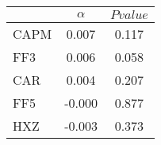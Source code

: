 \begin{tabular}{lcc}
\toprule
 & $\alpha$ & $Pvalue$ \\
\midrule
CAPM & 0.007 & 0.117 \\
FF3 & 0.006 & 0.058 \\
CAR & 0.004 & 0.207 \\
FF5 & -0.000 & 0.877 \\
HXZ & -0.003 & 0.373 \\
\bottomrule
\end{tabular}
